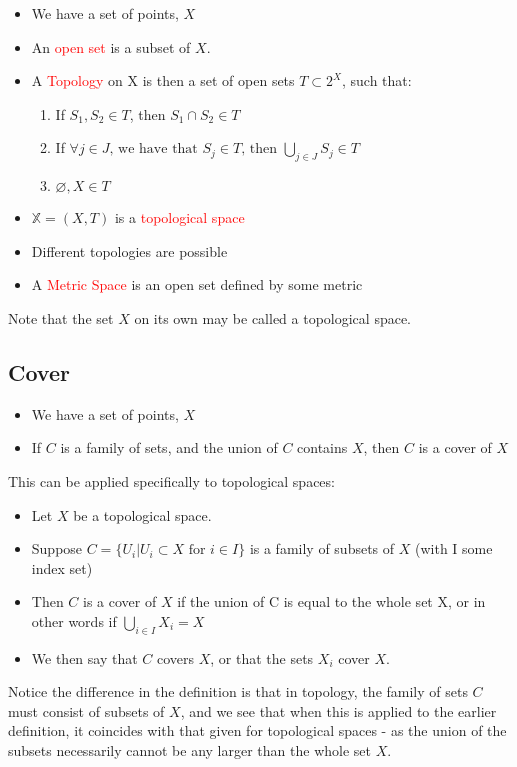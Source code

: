 \documentclass[a4paper]{article}
\begin{document}
\begin{itemize}
\item We have a set of points, $X$
\item An \textcolor{red}{open set} is a subset of $X$.
\item A \textcolor{red}{Topology} on X is then a set of open sets $T \subset 2^{X}$, such that:
	\begin{enumerate}
	\item If $S_{1}, S_{2} \in T$, then $S_{1} \cap S_{2} \in T$
    \item If $\forall j \in J \text{, we have that } S_{j} \in T \text{, then } \bigcup_{j \in J} S_{j} \in T$
    \item $\varnothing, X \in T$
	\end{enumerate}
\item $\mathbb{X} = (X, T)$ is a \textcolor{red}{topological space}
\item Different topologies are possible
\item A \textcolor{red}{Metric Space} is an open set defined by some metric
\end{itemize}

Note that the set $X$ on its own may be called a topological space.

\subsection*{Cover}
\begin{itemize}
\item We have a set of points, $X$
\item If $C$ is a family of sets, and the union of $C$ contains $X$, then $C$ is a cover of $X$
\end{itemize}
This can be applied specifically to topological spaces:
\begin{itemize}
\item Let $X$ be a topological space.
\item Suppose $C = \{ U_{i} | U_{i} \subset X \text{ for } i \in I \}$ is a family of subsets of $X$ (with I some index set)
\item Then $C$ is a cover of $X$ if the union of C is equal to the whole set X, or in other words if $\bigcup_{i \in I} X_{i} = X$
\item We then say that $C$ covers $X$, or that the sets $X_{i}$ cover $X$.
\end{itemize}
Notice the difference in the definition is that in topology, the family of sets $C$ must consist of subsets of $X$, and we see that when this is applied to the earlier definition, it coincides with that given for topological spaces - as the union of the subsets necessarily cannot be any larger than the whole set $X$.
\end{document}
